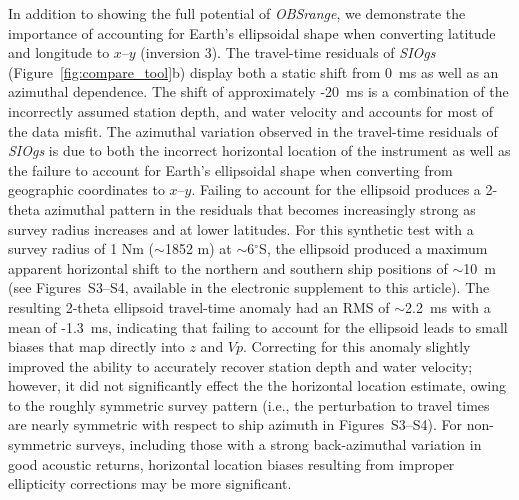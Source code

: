 In addition to showing the full potential of \textit{OBSrange}, we demonstrate the importance of accounting for Earth's ellipsoidal shape when converting latitude and longitude to $x$--$y$ (inversion 3). The travel-time residuals of \textit{SIOgs} (Figure~\ref{fig:compare_tool}b) display both a static shift from 0~ms as well as an azimuthal dependence. The shift of approximately -20~ms is a combination of the incorrectly assumed station depth, and water velocity and accounts for most of the data misfit. The azimuthal variation observed in the travel-time residuals of \textit{SIOgs} is due to both the incorrect horizontal location of the instrument as well as the failure to account for Earth's ellipsoidal shape when converting from geographic coordinates to $x$--$y$. Failing to account for the ellipsoid produces a 2-theta azimuthal pattern in the residuals that becomes increasingly strong as survey radius increases and at lower latitudes. For this synthetic test with a survey radius of 1 Nm ($\sim$1852 m) at $\sim$6$^{\circ}$S, the ellipsoid produced a maximum apparent horizontal shift to the northern and southern ship positions of $\sim$10~m (see Figures~S3--S4, available in the electronic supplement to this article). The resulting 2-theta ellipsoid travel-time anomaly had an RMS of $\sim$2.2~ms with a mean of -1.3~ms, indicating that failing to account for the ellipsoid leads to small biases that map directly into $z$ and $Vp$. Correcting for this anomaly slightly improved the ability to accurately recover station depth and water velocity; however, it did not significantly effect the the horizontal location estimate, owing to the roughly symmetric survey pattern (i.e., the perturbation to travel times are nearly symmetric with respect to ship azimuth in Figures~S3--S4). For non-symmetric surveys, including those with a strong back-azimuthal variation in good acoustic returns, horizontal location biases resulting from improper ellipticity corrections may be more significant.

